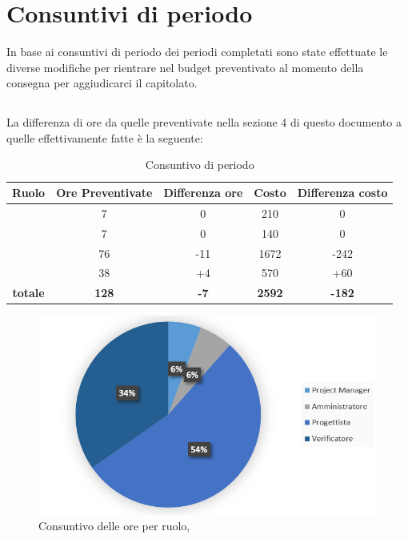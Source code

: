 \newpage
\section{Consuntivi di periodo}

In base ai consuntivi di periodo dei periodi completati sono state effettuate le diverse modifiche per rientrare nel budget preventivato al momento della consegna per aggiudicarci il capitolato.

\subsection{\PD}
La differenza di ore da quelle preventivate nella sezione 4 di questo documento a quelle effettivamente fatte è la seguente:

\begin{table}[h]
	\begin{center}
		\begin{tabular}{|c|c|c|c|c|}
			\hline
			\textbf{Ruolo}	& \textbf{Ore Preventivate} & \textbf{Differenza ore} & \textbf{Costo} & \textbf{Differenza costo}\\
			\hline
			\Pm &	7  & 0 &	210 &	0\\
			\hline
			\Am	&	7 &	0 & 140 & 0\\
			\hline
			\Prog	&	76 & -11 & 1672 & -242 \\
			\hline
			\Ver &	38 & +4 & 570 & +60\\
			\hline
			\textbf{totale}	&	\textbf{128} & \textbf{-7} & \textbf{2592} & \textbf{-182} \\
			\hline
		\end{tabular}
	\end{center}
	\caption{Consuntivo di periodo \PD}
\end{table}

\begin{figure}[H]
	\centering 
	\includegraphics[scale=1.25]{Immagini/Consuntivo/ConsuntivoPD.png}
	\caption{Consuntivo delle ore per ruolo, \PD}
\end{figure}

